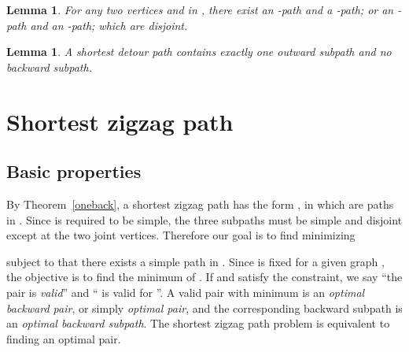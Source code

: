 \documentclass[review]{elsarticle}
\def\squarebox#1{\hbox to #1{\hfill\vbox to #1{\vfill}}}
\renewcommand{\qed}{\hspace*{\fill}
            \vbox{\hrule\hbox{\vrule\squarebox{.667em}\vrule}\hrule}\smallskip\newline}
\newtheorem{lem}[thm]{Lemma}
\begin{document}
\begin{lem}\label{2paths}
For any two vertices  and  in , there exist an
-path and a -path; or an -path and an -path; which
are disjoint.
\end{lem}

\begin{lem}\label{oneout}
A shortest detour path contains exactly one outward subpath and no
backward subpath.
\end{lem}

\section{Shortest zigzag path}

\subsection{Basic properties}
By Theorem~\ref{oneback}, a shortest zigzag path has the form
, in which  are
paths in . Since  is required to be simple, the three
subpaths must be simple and disjoint except at the two joint
vertices. Therefore our goal is to find  minimizing

subject to that there exists a simple path  in . Since  is fixed for
a given graph , the objective is to find the minimum of .
If  and  satisfy the constraint, we say ``the pair  is
{\em valid}'' and `` is valid for ''. A valid pair 
with minimum  is an \emph{optimal backward pair}, or simply
{\em optimal pair}, and the corresponding backward subpath is an
{\em optimal backward subpath}. The shortest zigzag path problem is
equivalent to finding an optimal pair.
\end{document}
